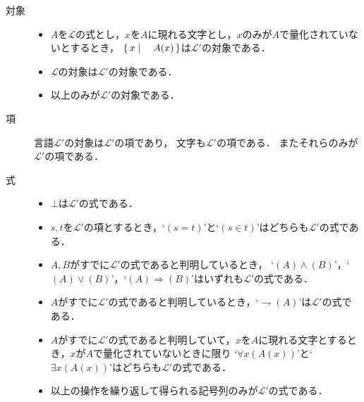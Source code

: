 	\begin{description}
		\item[対象]
			\begin{itemize}
				\item $A$を$\mathcal{L}$の式とし，$x$を$A$に現れる文字とし，$x$のみが$A$で量化されていないとするとき，
					$\left\{\, x \mid \quad A(x)\, \right\}$は$\mathcal{L}'$の対象である．
					
				\item $\mathcal{L}$の対象は$\mathcal{L}'$の対象である．
				
				\item 以上のみが$\mathcal{L}'$の対象である．
			\end{itemize}
			
		\item[項] 言語$\mathcal{L}'$の対象は$\mathcal{L}'$の項であり，
			文字も$\mathcal{L}'$の項である．
			またそれらのみが$\mathcal{L}'$の項である．
	
		\item[式] 
			\begin{itemize}
				\item $\bot$は$\mathcal{L}'$の式である．
				
				\item $s,t$を$\mathcal{L}'$の項とするとき，`$(s=t)$'と`$(s \in t)$'はどちらも$\mathcal{L}'$の式である．
					
				\item $A,B$がすでに$\mathcal{L}'$の式であると判明しているとき，
					`$(A) \wedge (B)$'，`$(A) \vee (B)$'，`$(A) \Longrightarrow (B)$'はいずれも$\mathcal{L}'$の式である．
				
				\item $A$がすでに$\mathcal{L}'$の式であると判明しているとき，`$\rightharpoondown (A)$'は$\mathcal{L}'$の式である．
				
				\item $A$がすでに$\mathcal{L}'$の式であると判明していて，$x$を$A$に現れる文字とするとき，$x$が$A$で量化されていないときに限り
					`$\forall x (A(x))$'と`$\exists x (A(x))$'はどちらも$\mathcal{L}'$の式である．
				
				\item 以上の操作を繰り返して得られる記号列のみが$\mathcal{L}'$の式である．
			\end{itemize}
	\end{description}
	
	
